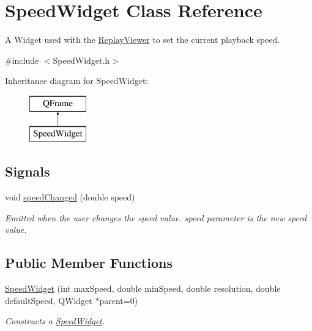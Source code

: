 \hypertarget{class_speed_widget}{\section{Speed\-Widget Class Reference}
\label{class_speed_widget}
}


A Widget used with the \hyperlink{class_replay_viewer}{Replay\-Viewer} to set the current playback speed.  




{\ttfamily \#include $<$Speed\-Widget.\-h$>$}

Inheritance diagram for Speed\-Widget\-:\begin{figure}[H]
\begin{center}
\leavevmode
\includegraphics[height=2.000000cm]{class_speed_widget}
\end{center}
\end{figure}
\subsection*{Signals}
\begin{DoxyCompactItemize}
\item 
\hypertarget{class_speed_widget_aca71c36579c3df141932d069316726fc}{void \hyperlink{class_speed_widget_aca71c36579c3df141932d069316726fc}{speed\-Changed} (double speed)}\label{class_speed_widget_aca71c36579c3df141932d069316726fc}

\begin{DoxyCompactList}\small\item\em Emitted when the user changes the speed value. speed parameter is the new speed value. \end{DoxyCompactList}\end{DoxyCompactItemize}
\subsection*{Public Member Functions}
\begin{DoxyCompactItemize}
\item 
\hyperlink{class_speed_widget_a50ed695331801ed0495d25c2b2692589}{Speed\-Widget} (int max\-Speed, double min\-Speed, double resolution, double default\-Speed, Q\-Widget $\ast$parent=0)
\begin{DoxyCompactList}\small\item\em Constructs a \hyperlink{class_speed_widget}{Speed\-Widget}. \end{DoxyCompactList}\end{DoxyCompactItemize}


